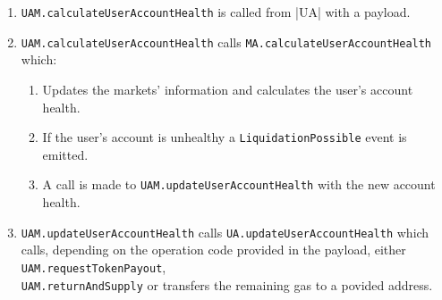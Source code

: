 \begin{enumerate}
  \item \verb|UAM.calculateUserAccountHealth| is called from |UA| with a payload.
  \item \verb|UAM.calculateUserAccountHealth| calls \verb|MA.calculateUserAccountHealth| which:
  \begin{enumerate}[label*=\arabic*.]
    \item Updates the markets' information and calculates the user's account health.
    \item If the user's account is unhealthy a \verb|LiquidationPossible| event is emitted.
    \item A call is made to \verb|UAM.updateUserAccountHealth| with the new account health.
  \end{enumerate}
  \item \verb|UAM.updateUserAccountHealth| calls \verb|UA.updateUserAccountHealth| which calls, depending on the operation code provided in the payload, either \verb|UAM.requestTokenPayout|, \\\verb|UAM.returnAndSupply| or transfers the remaining gas to a povided address.
\end{enumerate}

